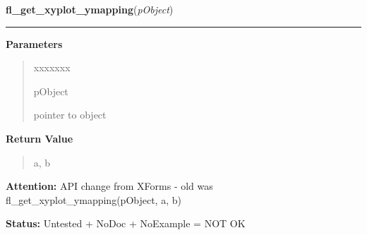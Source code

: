 \hspace{.8\funcindent}\begin{boxedminipage}{\funcwidth}

    \raggedright \textbf{fl\_get\_xyplot\_ymapping}(\textit{pObject})

    \vspace{-1.5ex}

    \rule{\textwidth}{0.5\fboxrule}
\setlength{\parskip}{2ex}
\setlength{\parskip}{1ex}
      \textbf{Parameters}
      \vspace{-1ex}

      \begin{quote}
        \begin{Ventry}{xxxxxxx}

          \item[pObject]

          pointer to object

        \end{Ventry}

      \end{quote}

      \textbf{Return Value}
    \vspace{-1ex}

      \begin{quote}
      a, b

      \end{quote}

\textbf{Attention:} API change from XForms - old was fl\_get\_xyplot\_ymapping(pObject, a, b)



\textbf{Status:} Untested + NoDoc + NoExample = NOT OK



    \end{boxedminipage}

    \label{xformslib:library:fl_set_xyplot_keys}

    \vspace{0.5ex}


